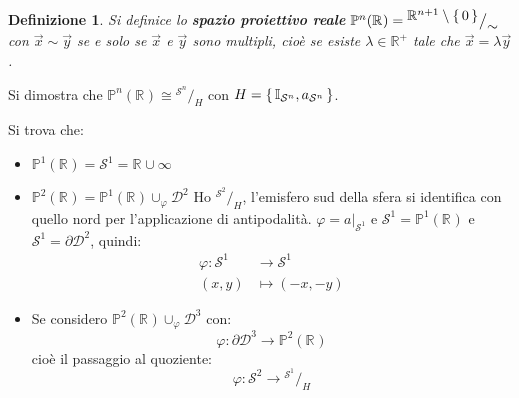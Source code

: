 \documentclass[10pt, twoside=false, x11names]{scrbook}
\newtheorem{definition}[theorem]{Definizione}
\renewcommand{\phi}{\varphi}
\newcommand{\RN}[1][]{\mathbb{R}^#1}
\newcommand{\Id}[1][]{\mathbb{I}_#1}
\newcommand{\Sph}[1][]{\mathcal{S}^#1}
\newcommand{\Disk}[1][]{\mathcal{D}^#1}
\newcommand*\quot[2]{{^{\textstyle #1}\big/_{\textstyle #2}}}
\begin{document}
\begin{definition}
  Si definice lo \textbf{spazio proiettivo reale} $ \mathbb{P}^n(\RN{}) = \quot{\RN{n+1} \setminus \set{0}}{\sim} $
  con $ \vec{x} \sim \vec{y} $ se e solo se $ \vec{x} $ e $ \vec{y} $ sono multipli,
  cioè se esiste $ \lambda \in \RN{+} $ tale che $ \vec{x} = \lambda \vec{y} $.
\end{definition}

Si dimostra che $ \mathbb{P}^n(\RN{}) \cong \quot{\Sph{n}}{H} $ con $ H = \set{\Id{\Sph{n}}, a_{\Sph{n}}} $.

Si trova che:
\begin{itemize}
\item $ \mathbb{P}^1(\RN{}) = \Sph{1} = \RN{} \cup {\infty} $
\item $ \mathbb{P}^2(\RN{}) = \mathbb{P}^1(\RN{}) \cup_\phi \Disk{2} $
  Ho $ \quot{\Sph{2}}{H} $, l'emisfero sud della sfera si identifica con quello
  nord per l'applicazione di antipodalità.
  $ \phi = a \big \lvert_{\Sph{1}} $ e $ \Sph{1} = \mathbb{P}^1(\RN{}) $ e $ \Sph{1} = \partial \Disk{2} $,
  quindi:
  \begin{align*}
    \phi \colon \Sph{1} & \to \Sph{1} \\
    (x,y) & \mapsto (-x,-y)
  \end{align*}
\item Se considero $ \mathbb{P}^2(\RN{}) \cup_\phi \Disk{3} $ con:
  \[
    \phi \colon \partial \Disk{3}  \to \mathbb{P}^2(\RN{})
  \]
  cioè il passaggio al quoziente:
  \[
    \phi \colon \Sph{2}  \to \quot{\Sph{1}}{H}
  \]
\end{itemize}
\end{document}
